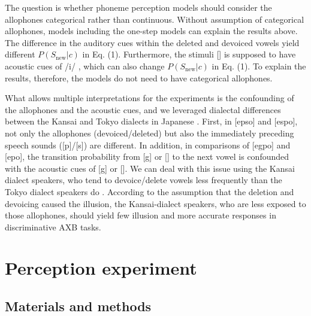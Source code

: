 \documentclass[a4paper,11pt,twocolumn]{article}
\begin{document}
The question is whether phoneme perception models should consider the allophones categorical rather than continuous. Without assumption of categorical allophones, models including the one-step models can explain the results above. The difference in the auditory cues within the deleted and devoiced vowels yield different $P(S_{\text{new}}|c)$ in Eq. (1). Furthermore, the stimuli [\textctc] is supposed to have acoustic cues of /i/ \cite{kubozono1999japanese_eng}, which can also change $P(S_{\text{new}}|c)$ in Eq. (1). To explain the results, therefore, the models do not need to have categorical allophones.

What allows multiple interpretations for the experiments is the confounding of the allophones and the acoustic cues, and we leveraged dialectal differences between the Kansai and Tokyo dialects in Japanese \cite{kishiyama2022onestep}. First, in [ep\textsubring{\textturnm}so] and [espo], not only the allophones (devoiced/deleted) but also the immediately preceding speech sounds ([p]/[s]) are different. In addition, in comparisons of [egpo] and [e\textctc{}po], the transition probability from [g] or [\textctc] to the next vowel is confounded with the acoustic cues of [g] or [\textctc]. We can deal with this issue using the Kansai dialect speakers, who tend to devoice/delete vowels less frequently than the Tokyo dialect speakers do \cite{byun2011_eng, byun2012_eng}. According to the assumption that the deletion and devoicing caused the illusion, the Kansai-dialect speakers, who are less exposed to those allophones, should yield few illusion and more accurate responses in discriminative AXB tasks.

\section{Perception experiment}


\subsection{Materials and methods}
\end{document}
